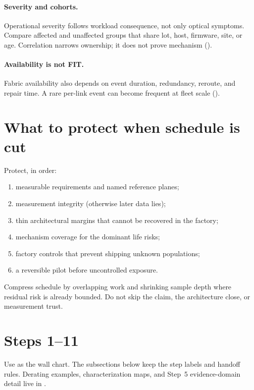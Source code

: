 \paragraph{Severity and cohorts.}
Operational severity follows workload consequence, not only optical symptoms.
Compare affected and unaffected groups that share lot, host, firmware, site, or
age. Correlation narrows ownership; it does not prove mechanism
().

\paragraph{Availability is not FIT.}
Fabric availability also depends on event duration, redundancy, reroute, and
repair time. A rare per-link event can become frequent at fleet scale
().

\section{What to protect when schedule is cut}

Protect, in order:
\begin{enumerate}
\item measurable requirements and named reference planes;
\item measurement integrity (otherwise later data lies);
\item thin architectural margins that cannot be recovered in the factory;
\item mechanism coverage for the dominant life risks;
\item factory controls that prevent shipping unknown populations;
\item a reversible pilot before uncontrolled exposure.
\end{enumerate}

Compress schedule by overlapping work and shrinking sample depth where residual
risk is already bounded. Do not skip the claim, the architecture close, or
measurement trust.

\section{Steps 1--11}
\label{sec:readiness-steps}

Use  as the wall chart. The subsections below keep the step
labels and handoff rules. Derating examples, characterization maps, and Step~5
evidence-domain detail live in
.

